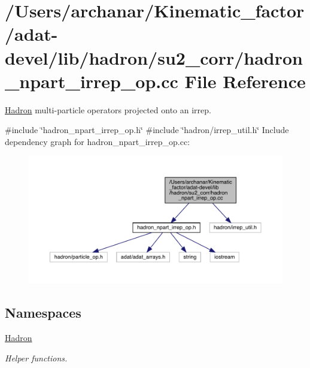\hypertarget{adat-devel_2lib_2hadron_2su2__corr_2hadron__npart__irrep__op_8cc}{}\section{/\+Users/archanar/\+Kinematic\+\_\+factor/adat-\/devel/lib/hadron/su2\+\_\+corr/hadron\+\_\+npart\+\_\+irrep\+\_\+op.cc File Reference}
\label{adat-devel_2lib_2hadron_2su2__corr_2hadron__npart__irrep__op_8cc}


\mbox{\hyperlink{namespaceHadron}{Hadron}} multi-\/particle operators projected onto an irrep.  


{\ttfamily \#include \char`\"{}hadron\+\_\+npart\+\_\+irrep\+\_\+op.\+h\char`\"{}}\newline
{\ttfamily \#include \char`\"{}hadron/irrep\+\_\+util.\+h\char`\"{}}\newline
Include dependency graph for hadron\+\_\+npart\+\_\+irrep\+\_\+op.\+cc\+:
\nopagebreak
\begin{figure}[H]
\begin{center}
\leavevmode
\includegraphics[width=350pt]{d6/d41/adat-devel_2lib_2hadron_2su2__corr_2hadron__npart__irrep__op_8cc__incl}
\end{center}
\end{figure}
\subsection*{Namespaces}
\begin{DoxyCompactItemize}
\item 
 \mbox{\hyperlink{namespaceHadron}{Hadron}}
\begin{DoxyCompactList}\small\item\em Helper functions. \end{DoxyCompactList}\end{DoxyCompactItemize}
